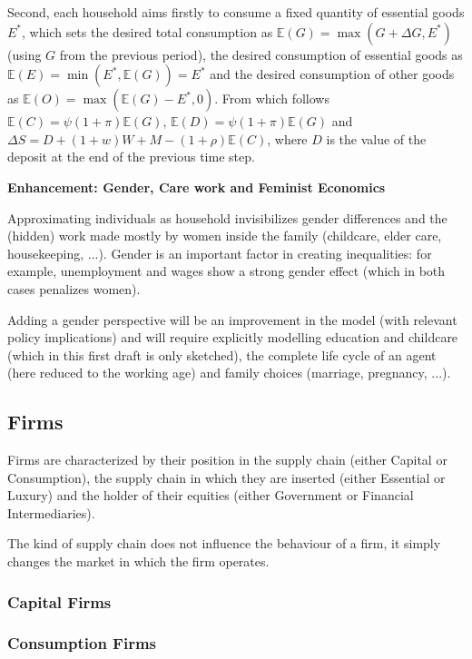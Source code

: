 \documentclass[a4paper, headings=standardclasses]{scrartcl}
\newenvironment{enh}[1][]{\begin{framed}\noindent\textbf{Enhancement: #1}\par}{\end{framed}}
\begin{document}
Second, each household aims firstly to consume a fixed quantity of essential goods $E^*$, which sets the desired total consumption as $\mathbb{E}(G) = \max(G + \Delta G, E^*)$ (using $G$ from the previous period), the desired consumption of essential goods as $\mathbb{E}(E) = \min(E^*, \mathbb{E}(G)) = E^*$ and the desired consumption of other goods as $\mathbb{E}(O) = \max(\mathbb{E}(G) - E^*, 0)$. From which follows $\mathbb{E}(C) = \psi (1+\pi) \mathbb{E}(G)$, $\mathbb{E}(D) = \psi (1+\pi) \mathbb{E}(G)$ and $\Delta S = D + (1+w) W + M - (1+\rho) \mathbb{E}(C)$, where $D$ is the value of the deposit at the end of the previous time step.

\begin{enh}[Gender, Care work and Feminist Economics]
	Approximating individuals as household invisibilizes gender differences and the (hidden) work made mostly by women inside the family (childcare, elder care, housekeeping, ...).
	Gender is an important factor in creating inequalities: for example, unemployment and wages show a strong gender effect (which in both cases penalizes women).

	Adding a gender perspective will be an improvement in the model (with relevant policy implications) and will require explicitly modelling education and childcare (which in this first draft is only sketched), the complete life cycle of an agent (here reduced to the working age) and family choices (marriage, pregnancy, ...).
\end{enh}

\subsection{Firms}
Firms are characterized by their position in the supply chain (either Capital or Consumption), the supply chain in which they are inserted (either Essential or Luxury) and the holder of their equities (either Government or Financial Intermediaries).

The kind of supply chain does not influence the behaviour of a firm, it simply changes the market in which the firm operates.

\subsubsection{Capital Firms}

\subsubsection{Consumption Firms}
\end{document}
